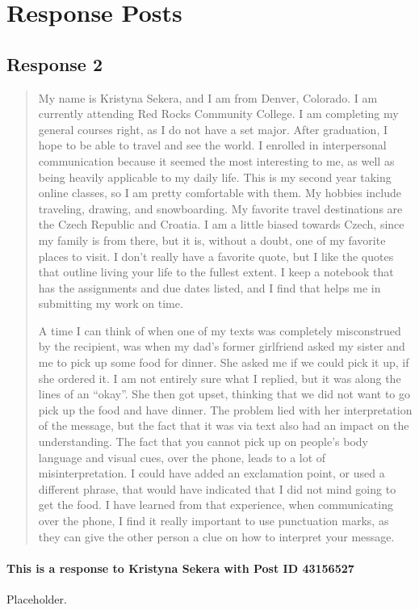 
\section{Response Posts}
  \subsection{Response 2}
    \begin{quotation}
      My name is Kristyna Sekera, and I am from Denver, Colorado. I am currently
        attending Red Rocks Community College. I am completing my general
        courses right, as I do not have a set major. After graduation, I hope
        to be able to travel and see the world. I enrolled in interpersonal
        communication because it seemed the most interesting to me, as well as
        being heavily applicable to my daily life. This is my second year taking
        online classes, so I am pretty comfortable with them. My hobbies include
        traveling, drawing, and snowboarding. My favorite travel destinations
        are the Czech Republic and Croatia. I am a little biased towards Czech,
        since my family is from there, but it is, without a doubt, one of my
        favorite places to visit. I don’t really have a favorite quote, but I
        like the quotes that outline living your life to the fullest extent. I
        keep a notebook that has the assignments and due dates listed, and I
        find that helps me in submitting my work on time.

      A time I can think of when one of my texts was completely misconstrued by
        the recipient, was when my dad’s former girlfriend asked my sister and
        me to pick up some food for dinner. She asked me if we could pick it up,
        if she ordered it. I am not entirely sure what I replied, but it was
        along the lines of an “okay”. She then got upset, thinking that we did
        not want to go pick up the food and have dinner. The problem lied with
        her interpretation of the message, but the fact that it was via text
        also had an impact on the understanding. The fact that you cannot pick
        up on people’s body language and visual cues, over the phone, leads to
        a lot of misinterpretation. I could have added an exclamation point, or
        used a different phrase, that would have indicated that I did not mind
        going to get the food. I have learned from that experience, when
        communicating over the phone, I find it really important to use
        punctuation marks, as they can give the other person a clue on how to
        interpret your message.
    \end{quotation}

    \paragraph{This is a response to Kristyna Sekera with Post ID 43156527}
      Placeholder.
